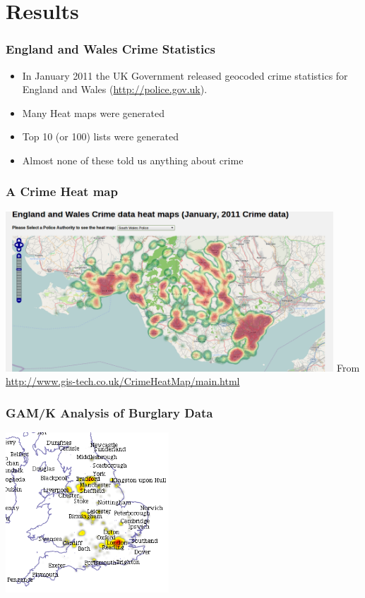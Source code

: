 \documentclass{beamer}
\begin{document}
\section{Results}

\begin{frame}[t]
\frametitle{England and Wales Crime Statistics}
\begin{itemize}
  \item In January 2011 the UK Government released geocoded crime statistics for England and Wales (\url{http://police.gov.uk}). 
  \item Many Heat maps were generated 
  \item Top 10 (or 100) lists were generated
  \item Almost none of these told us anything about crime
\end{itemize}
\end{frame}

\begin{frame}[t]
\frametitle{A Crime Heat map}
\includegraphics[height=6.0cm]{HeatMap.png}
From \href{http://www.gis-tech.co.uk/CrimeHeatMap/main.html}{http://www.gis-tech.co.uk/CrimeHeatMap/main.html}
\end{frame}

\begin{frame}[t]
\frametitle{GAM/K Analysis of Burglary Data}
\includegraphics[height=6.0cm]{gam_burglary.png}
\end{frame}
\end{document}

